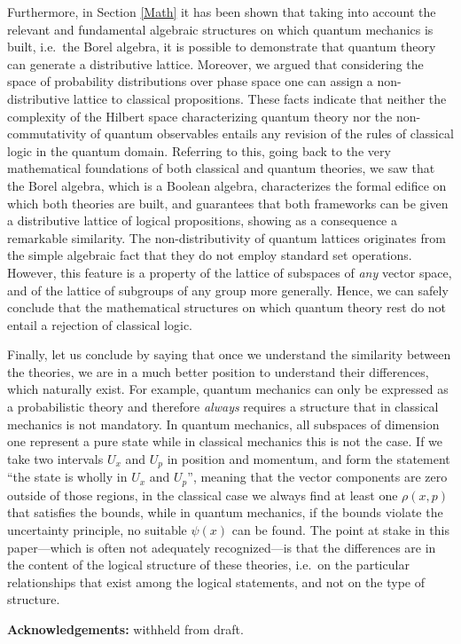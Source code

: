 \documentclass[11pt, executivepaper]{article}
\begin{document}
Furthermore, in Section \ref{Math} it has been shown that taking into account the relevant and fundamental algebraic structures on which quantum mechanics is built, i.e.\ the Borel algebra, it is possible to demonstrate that quantum theory can generate a distributive lattice. Moreover, we argued that considering the space of probability distributions over phase space one can assign a non-distributive lattice to classical propositions. These facts indicate that neither the complexity of the Hilbert space characterizing quantum theory nor the non-commutativity of quantum observables entails any revision of the rules of classical logic in the quantum domain. Referring to this, going back to the very mathematical foundations of both classical and quantum theories, we saw that the Borel algebra, which is a Boolean algebra, characterizes the formal edifice on which both theories are built, and guarantees that both frameworks can be given a distributive lattice of logical propositions, showing as a consequence a remarkable similarity. The non-distributivity of quantum lattices originates from the simple algebraic fact that they do not employ standard set operations. However, this feature is a property of the lattice of subspaces of \emph{any} vector space, and of the lattice of subgroups of any group more generally. Hence, we can safely conclude that the mathematical structures on which quantum theory rest do not entail a rejection of classical logic. 

Finally, let us conclude by saying that once we understand the similarity between the theories, we are in a much better position to understand their differences, which naturally exist. For example, quantum mechanics can only be expressed as a probabilistic theory and therefore \emph{always} requires a structure that in classical mechanics is not mandatory. In quantum mechanics, all subspaces of dimension one represent a pure state while in classical mechanics this is not the case. If we take two intervals $U_x$ and $U_p$ in position and momentum, and form the statement ``the state is wholly in $U_x$ and $U_p$'', meaning that the vector components are zero outside of those regions, in the classical case we always find at least one $\rho(x,p)$ that satisfies the bounds, while in quantum mechanics, if the bounds violate the uncertainty principle, no suitable $\psi(x)$ can be found. The point at stake in this paper---which is often not adequately recognized---is that the differences  are in the content of the logical structure of these theories, i.e.\ on the particular relationships that exist among the logical statements, and not on the type of structure.
\vspace{5mm}

\textbf{Acknowledgements:} withheld from draft.
\clearpage



\end{document}
